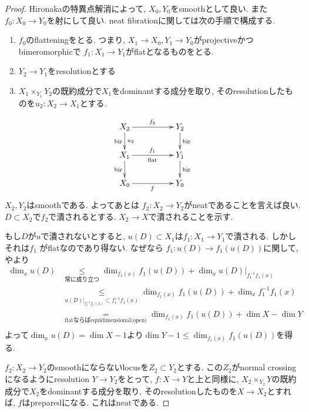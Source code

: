 \documentclass[dvipdfmx,a4paper,11pt]{article} %
\theoremstyle{definition}
\theoremstyle{remark}
\numberwithin{equation}{section}
\begin{document}
\begin{proof}
Hironakaの特異点解消によって, $X_0, Y_0$をsmoothとして良い. また$f_0 : X_0 \to Y_0$を射にして良い. 
neat fibrationに関しては次の手順で構成する.
\begin{enumerate}
\item $f_0$のflatteningをとる. つまり,  \(  X_1 \to X_0,  Y_1 \to Y_0 \)がprojectiveかつbimeromorphicで \( f_1 : X_1 \to Y_1\)がflatとなるものをとる. 
\item \( Y_2 \to Y_1\)をresolutionとする
\item \( X_1 \times_{Y_1}  Y_2\)の既約成分で$X_1$をdominantする成分を取り, そのresolutionしたものを$u_2: X_2 \to X_1$とする.
\end{enumerate}
 \[
\xymatrix@C=50pt@R=20pt{
X_2  \ar@{->}[r]^{f_2}\ar@{->}[d]^{u_2}_{\text{bir}} &Y_2 \ar@{->}[d]^{\text{bir}} \\
X_1 \ar@{->}[r]^{f_1}_{\text{flat}}\ar@{->}[d]_{\text{bir}} &Y_1\ar@{->}[d]^{\text{bir}} \\
X_0  \ar@{->}[r]_{f}& Y_0\\
}
\]
$X_2, Y_2$はsmoothである. 
よってあとは \( f_2 : X_2 \to Y_2 \)がneatであることを言えば良い. 
\( D \subset X_2\)で$f_2$で潰されるとする. 
$X_2 \to X$で潰されることを示す. 

もし$D$が$u$で潰されないとすると, 
$u(D)\subset X_1$は$f_1 : X_1 \to Y_1$で潰される. 
しかしそれは\( f_1\) がflatなのであり得ない.
なぜなら
$f_1 : u(D) \to f_1(u(D))$に関して, \cite[Thm 2.1.18]{SCV7}や\cite[Prop 2.2.11]{SCV7}より
\begin{align*}
\dim_x u(D) 
& \underset{\text{常に成り立つ}}{\le} 
\dim_{f_1(x)}f_1(u(D)) + \dim_x u(D)|_{f_1^{-1}f_1(x)} \\
& \underset{u(D)|_{f_1^{-1}f_1(x)} \subset f_1^{-1}f_1(x)}{\le} 
\dim_{f_1(x)}f_1(u(D)) + \dim_x f_1^{-1}f_1(x) \\
& \underset{\text{flatならばequidimensional(open)}}{=} 
\dim_{f_1(x)}f_1(u(D)) + \dim X - \dim Y\\
\end{align*}
よって$\dim_x u(D) =\dim X -1$より$\dim Y - 1 \le \dim_{f_1(x)}f_1(u(D)) $を得る. 

$f_2 : X_2 \to Y_2$のsmoothにならないlocusを$Z_2 \subset Y_2$とする. 
この$Z_2$がnormal crossingになるようにresolution $Y \to Y_2$をとって, $f: X \to Y$と上と同様に, 
 \( X_2 \times_{Y_2}  Y\)の既約成分で$X_2$をdominantする成分を取り, そのresolutionしたものを$X \to X_2$とすれば, $f$はpreparedになる. これはneatである. 
\end{proof}
\end{document}
